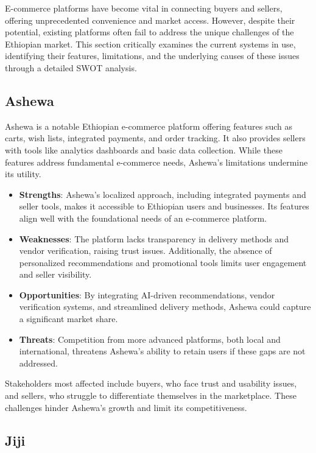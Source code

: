 \documentclass[12pt]{report}
\begin{document}
E-commerce platforms have become vital in connecting buyers and sellers, offering
unprecedented convenience and market access. However, despite their potential, existing
platforms often fail to address the unique challenges of the Ethiopian market. This section
critically examines the current systems in use, identifying their features, limitations, and the
underlying causes of these issues through a detailed SWOT analysis.

\subsection*{Ashewa}

Ashewa is a notable Ethiopian e-commerce platform offering features such as carts, wish
lists, integrated payments, and order tracking. It also provides sellers with tools like analytics
dashboards and basic data collection. While these features address fundamental e-commerce
needs, Ashewa’s limitations undermine its utility.

\begin{itemize}
	\item \textbf{Strengths}: Ashewa’s localized approach, including integrated payments and seller
	      tools, makes it accessible to Ethiopian users and businesses. Its features align well
	      with the foundational needs of an e-commerce platform.
	\item \textbf{Weaknesses}: The platform lacks transparency in delivery methods and vendor
	      verification, raising trust issues. Additionally, the absence of personalized
	      recommendations and promotional tools limits user engagement and seller visibility.
	\item \textbf{Opportunities}: By integrating AI-driven recommendations, vendor verification
	      systems, and streamlined delivery methods, Ashewa could capture a significant
	      market share.
	\item \textbf{Threats}: Competition from more advanced platforms, both local and international,
	      threatens Ashewa’s ability to retain users if these gaps are not addressed.
\end{itemize}

Stakeholders most affected include buyers, who face trust and usability issues, and sellers,
who struggle to differentiate themselves in the marketplace. These challenges hinder
Ashewa’s growth and limit its competitiveness.

\subsection*{Jiji}
\end{document}
